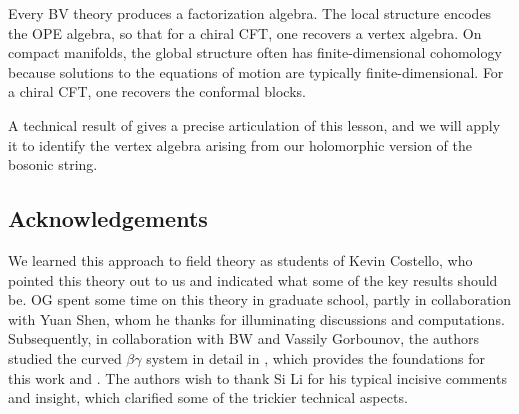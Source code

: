 \begin{lesson}[\cite{CG1,CG2}]
Every BV theory produces a factorization algebra. 
The local structure encodes the OPE algebra, so that for a chiral CFT, one recovers a vertex algebra. 
On compact manifolds, the global structure often has finite-dimensional cohomology because solutions to the equations of motion are typically finite-dimensional.
For a chiral CFT, one recovers the conformal blocks.
\end{lesson}

A technical result of \cite{CG1} gives a precise articulation of this lesson,
and we will apply it to identify the vertex algebra arising from our holomorphic version of the bosonic string.

\subsection{Acknowledgements}

We learned this approach to field theory as students of Kevin Costello,
who pointed this theory out to us and indicated what some of the key results should be.
OG spent some time on this theory in graduate school,
partly in collaboration with Yuan Shen,
whom he thanks for illuminating discussions and computations.
Subsequently, in collaboration with BW and Vassily Gorbounov,
the authors studied the curved $\beta\gamma$ system in detail in \cite{GGW},
which provides the foundations for this work and \cite{}.
The authors wish to thank Si Li for his typical incisive comments and insight,
which clarified some of the trickier technical aspects.

